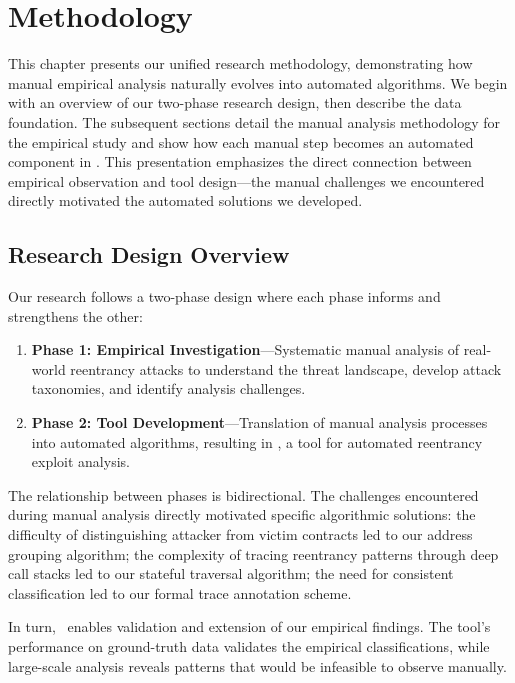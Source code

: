 \chapter{Methodology}
\label{ch:methodology}

This chapter presents our unified research methodology, demonstrating how manual empirical analysis naturally evolves into automated algorithms. We begin with an overview of our two-phase research design, then describe the data foundation. The subsequent sections detail the manual analysis methodology for the empirical study and show how each manual step becomes an automated component in \ToolName. This presentation emphasizes the direct connection between empirical observation and tool design---the manual challenges we encountered directly motivated the automated solutions we developed.

\section{Research Design Overview}
\label{sec:meth-overview}

Our research follows a two-phase design where each phase informs and strengthens the other:

\begin{enumerate}
    \item \textbf{Phase 1: Empirical Investigation}---Systematic manual analysis of real-world reentrancy attacks to understand the threat landscape, develop attack taxonomies, and identify analysis challenges.
    
    \item \textbf{Phase 2: Tool Development}---Translation of manual analysis processes into automated algorithms, resulting in \ToolName, a tool for automated reentrancy exploit analysis.
\end{enumerate}

The relationship between phases is bidirectional. The challenges encountered during manual analysis directly motivated specific algorithmic solutions: the difficulty of distinguishing attacker from victim contracts led to our address grouping algorithm; the complexity of tracing reentrancy patterns through deep call stacks led to our stateful traversal algorithm; the need for consistent classification led to our formal trace annotation scheme.

In turn, \ToolName\ enables validation and extension of our empirical findings. The tool's performance on ground-truth data validates the empirical classifications, while large-scale analysis reveals patterns that would be infeasible to observe manually.

